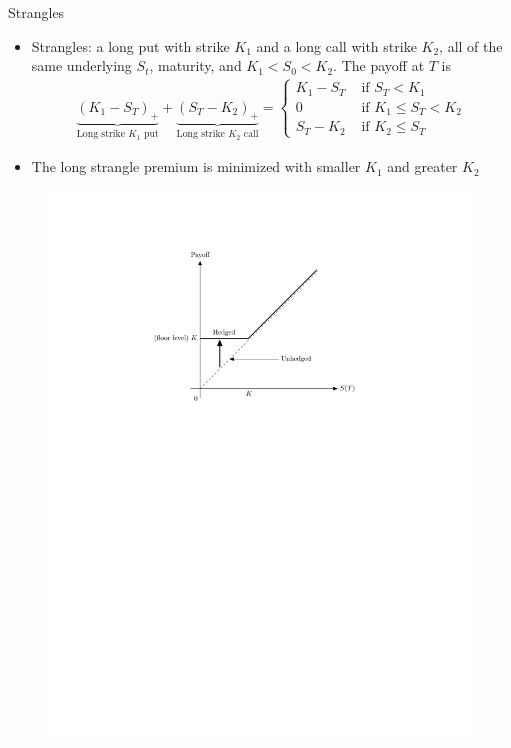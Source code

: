 \documentclass[10pt,handout]{beamer}
\theoremstyle{definition}
\begin{document}
\begin{frame}{Strangles}
  \begin{itemize}
    \item Strangles: a long put with strike $K_1$ and a long call with strike $K_2$, all of the same underlying $S_t$, maturity, and $K_1 < S_0 < K_2$. The payoff at $T$ is \vspace{-1mm}
      \begin{align*}
        \underbrace{(K_1 - S_T)_+}_{\text{Long strike $K_1$ put}} + \underbrace{(S_T - K_2)_+}_{\text{Long strike $K_2$ call}} = \begin{cases}K_1 - S_T & \text{ if } S_T < K_1\\ 0 & \text{ if } K_1\leqslant S_T < K_2 \\ S_T - K_2 & \text{ if } K_2\leqslant S_T \end{cases}
      \end{align*}
    \item The long strangle premium is minimized with smaller $K_1$ and greater $K_2$  
  \end{itemize}
  \begin{figure}[!htbp]
    \centering
    \includegraphics[scale=0.7,page=13]{fig/note08/lo.pdf}
  \end{figure}
\end{frame}
\end{document}
